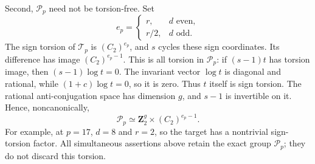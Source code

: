 Second, \(\mathcal P_p\) need not be torsion-free. Set
\[
 e_p=\begin{cases}r,&d\text{ even},\\r/2,&d\text{ odd}.\end{cases}
\]
The sign torsion of \(\mathcal T_p\) is \((C_2)^{e_p}\),
and \(s\) cycles these sign coordinates. Its difference
has image \((C_2)^{e_p-1}\). This is all torsion in
\(\mathcal P_p\): if \((s-1)t\) has torsion image,
then \((s-1)\log t=0\). The invariant vector \(\log t\)
is diagonal and rational, while \((1+c)\log t=0\),
so it is zero. Thus \(t\) itself is sign torsion.
The rational anti-conjugation space has dimension \(g\),
and \(s-1\) is invertible on it. Hence, noncanonically,
\[
                  \mathcal P_p\simeq
                   \mathbf Z_2^g\times(C_2)^{e_p-1}.
\]
For example, at \(p=17\), \(d=8\) and \(r=2\),
so the target has a nontrivial sign-torsion factor.
All simultaneous assertions above retain the exact group
\(\mathcal P_p\); they do not discard this torsion.
